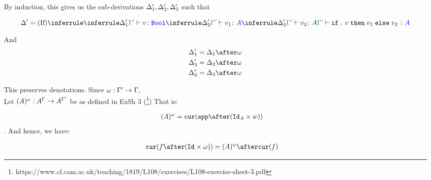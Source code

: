 \documentclass{report}
\begin{document}
By induction, this gives us the sub-derivations $\Delta_1', \Delta_2', \Delta_3'$ such that

\begin{equation}
    \D' = \ntreeruleIII{If}{
        \treeruleI{\D_1'}{\typerelation{\G'}{v}{\B}}
        }{
        \treeruleI{\D_2'}{\typerelation{\G'}{v_1}{ A}}
        }{
        \treeruleI{\D_3'}{\typerelation{\G'}{v_2}{ A}}
    }{
        \typerelation{\G'}{\pifthenelse{A}{v}{v_1}{v_2}}{ A}
    }
\end{equation}

And 
\begin{align*}
    \D_1' & =\D_1 \after \w\\
    \D_3' & =\D_2 \after \w\\
    \D_3' & =\D_3 \after \w 
\end{align*}


This preserves denotations.
Since $\omega: \Gamma' \rightarrow \Gamma$, \\
Let $(A)^{\omega}: A^{\Gamma}\rightarrow A^{\Gamma'}$ be as defined in ExSh 3 (\footnote{https://www.cl.cam.ac.uk/teaching/1819/L108/exercises/L108-exercise-sheet-3.pdf})
That is:

\begin{align*}
    (A)^{\w} & = \cur{\app\after(\Id{A}\times w)}
\end{align*}.
And hence, we have:

\begin{align*}
    \cur{f\after(\Id{}\times \w)} & = (A)^{\w} \after\cur{f}
\end{align*}
\end{document}
